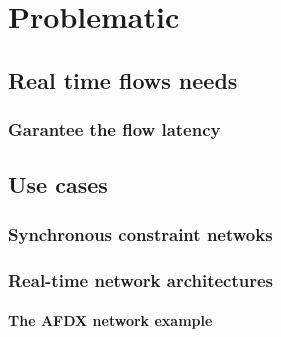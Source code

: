 

\chapter{Problematic}
\doMinitoc

\section{Real time flows needs}

\subsection{Garantee the flow latency}

\section{Use cases}

\subsection{Synchronous constraint netwoks}

\subsection{Real-time network architectures}

\subsubsection{The AFDX network example}

